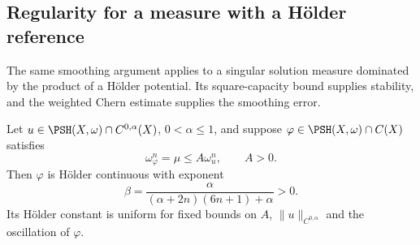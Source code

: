 \subsection{Regularity for a measure with a H\"older reference}

The same smoothing argument applies to a singular solution measure dominated by the product of a H\"older potential. Its square-capacity bound supplies stability, and the weighted Chern estimate supplies the smoothing error.

\begin{theorem}\label{thm:holder-dominated-continuous-regularity}
Let $u\in\PSH(X,\omega)\cap C^{0,\alpha}(X)$, $0<\alpha\leq1$, and suppose $\varphi\in\PSH(X,\omega)\cap C(X)$ satisfies
\[
 \omega_\varphi^n=\mu\leq A\omega_u^n,
 \qquad A>0.
\]
Then $\varphi$ is H\"older continuous with exponent
\[
 \beta=\frac{\alpha}{(\alpha+2n)(6n+1)+\alpha}>0.
\]
Its H\"older constant is uniform for fixed bounds on $A$, $\|u\|_{C^{0,\alpha}}$ and the oscillation of $\varphi$.
\end{theorem}
